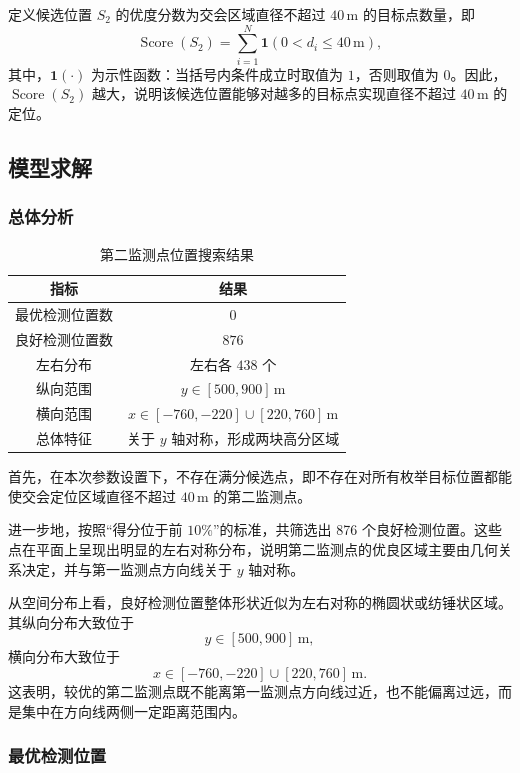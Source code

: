 \documentclass[withoutpreface,bwprint]{cumcmthesis}
\begin{document}
定义候选位置 $S_2$ 的优度分数为交会区域直径不超过 $40\,\mathrm{m}$ 的目标点数量，即
\[
\operatorname{Score}(S_2)
=
\sum_{i=1}^{N}
\mathbf{1}\!\left(0<d_i\leq40\,\mathrm{m}\right),
\]
其中，$\mathbf{1}(\cdot)$ 为示性函数：当括号内条件成立时取值为 $1$，否则取值为 $0$。因此，$\operatorname{Score}(S_2)$ 越大，说明该候选位置能够对越多的目标点实现直径不超过 $40\,\mathrm{m}$ 的定位。


\subsection{模型求解}
\subsubsection{总体分析}
\begin{table}[htbp]
    \centering
    \caption{第二监测点位置搜索结果}
    \label{tab:monitoring-position-results}
    \begin{tabular}{cc}
        \hline
        指标 & 结果 \\
        \hline
        最优检测位置数 & $0$ \\
        良好检测位置数 & $876$ \\
        左右分布 & 左右各 $438$ 个 \\
        纵向范围 & $y\in[500,900]\,\mathrm{m}$ \\
        横向范围 &
        $x\in[-760,-220]\cup[220,760]\,\mathrm{m}$ \\
        总体特征 & 关于 $y$ 轴对称，形成两块高分区域 \\
        \hline
    \end{tabular}
\end{table}


首先，在本次参数设置下，不存在满分候选点，即不存在对所有枚举目标位置都能使交会定位区域直径不超过 $40\,\mathrm{m}$ 的第二监测点。

进一步地，按照“得分位于前 $10\%$”的标准，共筛选出 876 个良好检测位置。这些点在平面上呈现出明显的左右对称分布，说明第二监测点的优良区域主要由几何关系决定，并与第一监测点方向线关于 $y$ 轴对称。

从空间分布上看，良好检测位置整体形状近似为左右对称的椭圆状或纺锤状区域。其纵向分布大致位于
\[
y\in[500,900]\,\mathrm{m},
\]
横向分布大致位于
\[
x\in[-760,-220]\cup[220,760]\,\mathrm{m}.
\]
这表明，较优的第二监测点既不能离第一监测点方向线过近，也不能偏离过远，而是集中在方向线两侧一定距离范围内。

\subsubsection{最优检测位置}
\end{document}
